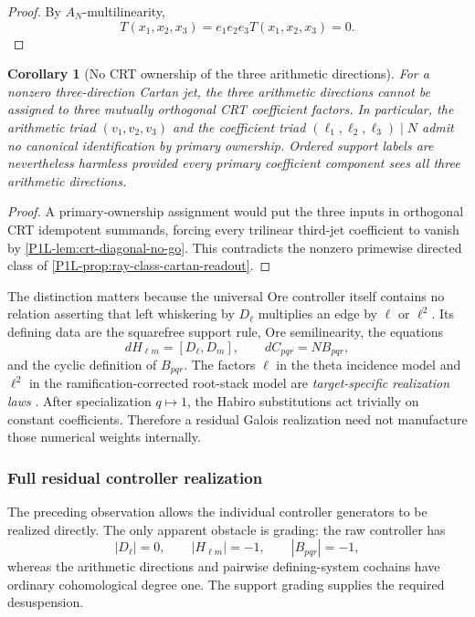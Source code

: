 \documentclass[11pt]{article}
\newtheorem{corollary}[theorem]{Corollary}
\theoremstyle{remark}
\begin{document}
\begin{proof}
By $A_N$-multilinearity,
\[
 T(x_1,x_2,x_3)=e_1e_2e_3T(x_1,x_2,x_3)=0.
\]
\end{proof}

\begin{corollary}[No CRT ownership of the three arithmetic directions]
\label{P1L-cor:two-triads-no-ownership}
For a nonzero three-direction Cartan jet, the three arithmetic directions
cannot be assigned to three mutually orthogonal CRT coefficient factors.
In particular, the arithmetic triad \((v_1,v_2,v_3)\) and the coefficient
triad \((\ell_1,\ell_2,\ell_3)\mid N\) admit no canonical
identification by primary ownership.  Ordered support labels are nevertheless harmless provided every
primary coefficient component sees all three arithmetic directions.
\end{corollary}

\begin{proof}
A primary-ownership assignment would put the three inputs in orthogonal CRT
idempotent summands, forcing every trilinear third-jet coefficient to vanish
by \cref{P1L-lem:crt-diagonal-no-go}.  This contradicts the nonzero primewise directed class of
\cref{P1L-prop:ray-class-cartan-readout}.
\end{proof}


The distinction matters because the universal Ore controller itself contains no relation asserting that left whiskering by $D_\ell$ multiplies an edge by $\ell$ or $\ell^2$.  Its defining data are the squarefree support rule, Ore semilinearity, the equations
\[
 dH_{\ell m}=[D_\ell,D_m],
\qquad
 dC_{pqr}=NB_{pqr},
\]
and the cyclic definition of $B_{pqr}$.  The factors $\ell$ in the theta incidence model and $\ell^2$ in the ramification-corrected root-stack model are \emph{target-specific realization laws} .  After specialization $q\mapsto1$, the Habiro substitutions act trivially on constant coefficients.  Therefore a residual Galois realization need not manufacture those numerical weights internally.


\subsubsection{Full residual controller realization}\label{P1L-sec:full-galois-controller}

The preceding observation allows the individual controller generators to be realized directly.  The only apparent obstacle is grading: the raw controller has
\[
 |D_\ell|=0,\qquad |H_{\ell m}|=-1,\qquad |B_{pqr}|=-1,
\]
whereas the arithmetic directions and pairwise defining-system cochains have ordinary cohomological degree one.  The support grading supplies the required desuspension.
\end{document}
